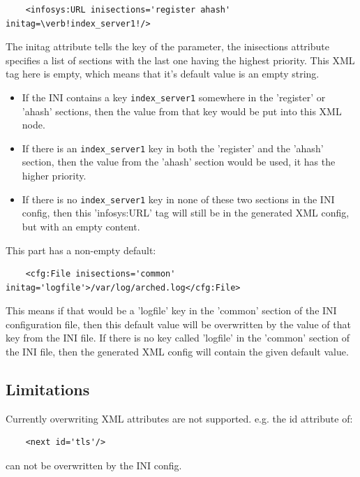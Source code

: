 \documentclass{article}
\begin{document}
\begin{verbatim}
	<infosys:URL inisections='register ahash' initag=\verb!index_server1!/>
\end{verbatim}


The initag attribute tells the key of the parameter, the inisections attribute specifies a list of sections with the last one having the highest priority. This XML tag here is empty, which means that it's default value is an empty string.

\begin{itemize}
	\item If the INI contains a key \verb!index_server1! somewhere in the 'register' or 'ahash' sections, then the value from that key would be put into this XML node.
	\item If there is an \verb!index_server1! key in both the 'register' and the 'ahash' section, then the value from the 'ahash' section would be used, it has the higher priority.
	\item If there is no \verb!index_server1! key in none of these two sections in the INI config, then this 'infosys:URL' tag will still be in the generated XML config, but with an empty content.
\end{itemize}

This part has a non-empty default:

\begin{verbatim}
	<cfg:File inisections='common' initag='logfile'>/var/log/arched.log</cfg:File>
\end{verbatim}

This means if that would be a 'logfile' key in the 'common' section of the INI configuration file, then this default value will be overwritten by the value of that key from the INI file. If there is no key called 'logfile' in the 'common' section of the INI file, then the generated XML config will contain the given default value.

\subsection{Limitations}

Currently overwriting XML attributes are not supported. e.g. the id attribute of:

\begin{verbatim}
	<next id='tls'/>
\end{verbatim}

can not be overwritten by the INI config.
\end{document}
